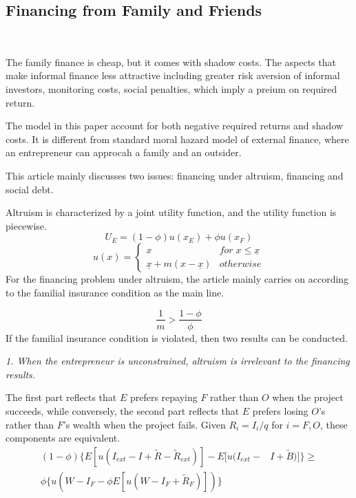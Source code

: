 \documentclass{article}
\begin{document}
    


\subsection{Financing from Family and Friends}
    ~\

    The family finance is cheap, but it comes with shadow costs. The aspects that make informal finance less attractive including 
    greater risk aversion of informal investors, monitoring costs, social penalties, which imply a preium on required return. 

    The model in this paper account for both negative required returns and shadow costs. It is different
    from standard moral hazard model of external finance, where an entrepreneur can approcah a family and an outsider.  

    This article mainly discusses two issues: financing under altruism, financing and social debt.

    Altruism is characterized by a joint utility function, and the utility function is piecewise. 
    \begin{equation}
        U_E=(1-\phi)u(x_E)+\phi u(x_F)
    \end{equation}
    \begin{equation}
        u(x)=\begin{cases}
            x& for\; x\leq \underline{x}  \\

            \underline{x}+m(x-\underline{x})& otherwise
        \end{cases}
    \end{equation}
    For the financing problem under altruism, the article mainly carries on according to the familial insurance condition as the main line.
   
    \begin{equation}
        \frac{1}{m}>\frac{1-\phi}{\phi}
    \end{equation}
    If the familial insurance condition is violated, then two results can be conducted. 
    
    \emph{1. When the entrepreneur is unconstrained, altruism is irrelevant to the financing results.} 
    
    The first part reflects that $E$ prefers repaying $F$ rather than $O$ when the project succeeds, 
    while conversely, the second part reflects that $E$ prefers losing $O$’s rather than $F$’s wealth when the project fails. 
    Given $R_i = I_i/q$ for $i = F,O$, these components are equivalent. 
    \begin{equation}
        \begin{aligned}
            (1-\phi)\big\{E[u(I_{ext}-I+\tilde{R}-\tilde{R}_{ext})]-
            E[u(I_{ext}-&I+\tilde{B})]\big\}\ge \\
            \phi\big\{u(W-I_F-\phi E[u(W-I_F+\tilde{R}_F)])\big\} 
        \end{aligned}
    \end{equation}
\end{document}

